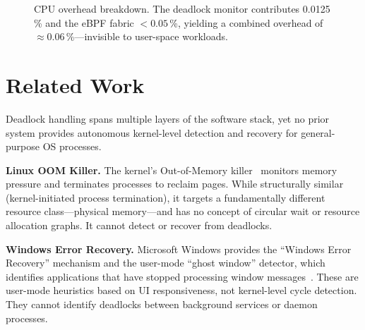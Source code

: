 \documentclass[11pt,letterpaper]{article}
\begin{document}
\begin{figure}[h]
\centering
{}
\caption{CPU overhead breakdown.  The deadlock monitor contributes
  0.0125\,\% and the eBPF fabric $< 0.05$\,\%, yielding a combined
  overhead of $\approx 0.06$\,\%---invisible to user-space workloads.}
\label{fig:overhead}
\end{figure}

\section{Related Work}

Deadlock handling spans multiple layers of the software stack, yet no
prior system provides autonomous kernel-level detection and recovery for
general-purpose OS processes.

\textbf{Linux OOM Killer.}  The kernel's Out-of-Memory
killer~\cite{oom} monitors memory pressure and terminates processes to
reclaim pages.  While structurally similar (kernel-initiated process
termination), it targets a fundamentally different resource
class---physical memory---and has no concept of circular wait or resource
allocation graphs.  It cannot detect or recover from deadlocks.

\textbf{Windows Error Recovery.}  Microsoft Windows provides the
``Windows Error Recovery'' mechanism and the user-mode ``ghost window''
detector, which identifies applications that have stopped processing
window messages~\cite{ms-recovery}.  These are user-mode heuristics
based on UI responsiveness, not kernel-level cycle detection.  They
cannot identify deadlocks between background services or daemon
processes.
\end{document}
